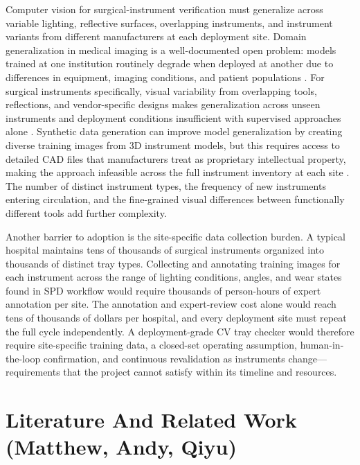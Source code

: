 \documentclass[10pt,a4paper]{article}
\begin{document}
Computer vision for surgical-instrument verification must generalize across
variable lighting, reflective surfaces, overlapping instruments, and instrument
variants from different manufacturers at each deployment site. Domain
generalization in medical imaging is a well-documented open problem: models
trained at one institution routinely degrade when deployed at another due to
differences in equipment, imaging conditions, and patient populations
\cite{yang-et-al-2024}. For surgical instruments specifically, visual
variability from overlapping tools, reflections, and vendor-specific designs
makes generalization across unseen instruments and deployment conditions
insufficient with supervised approaches alone \cite{kienle-et-al-2025}.
Synthetic data generation can improve model generalization by creating diverse
training images from 3D instrument models, but this requires access to detailed
CAD files that manufacturers treat as proprietary intellectual property, making
the approach infeasible across the full instrument inventory at each site
\cite{yang-et-al-2025-neeco}. The
number of distinct instrument types, the frequency of new instruments entering
circulation, and the fine-grained visual differences between functionally
different tools add further complexity.

Another barrier to adoption is the site-specific data collection burden. A typical hospital maintains tens of
thousands of surgical instruments organized into thousands of distinct tray
types. Collecting and annotating training images for each instrument across the
range of lighting conditions, angles, and wear states found in SPD workflow
would require thousands of person-hours of expert annotation per site. The
annotation and expert-review cost alone would reach tens of thousands of
dollars per hospital, and every deployment site must repeat the full cycle
independently. A deployment-grade CV tray checker would therefore require
site-specific training data, a closed-set operating assumption,
human-in-the-loop confirmation, and continuous revalidation as instruments
change---requirements that the project cannot satisfy within its timeline and
resources.


\section{Literature And Related Work \hfill {\normalfont\small (Matthew, Andy, Qiyu)}}
\label{sec:literature-and-related-work}
\end{document}

